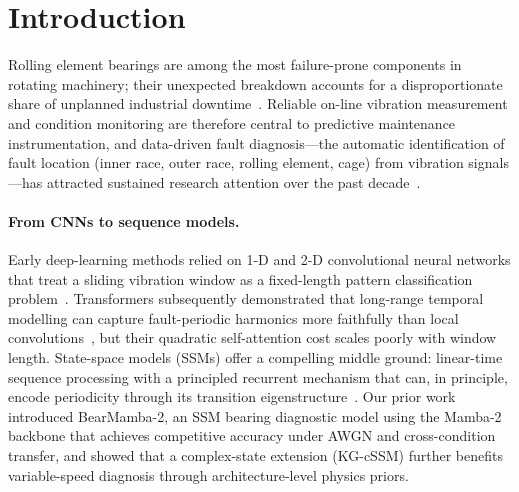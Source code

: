 
\section{Introduction}
\label{sec:intro}

Rolling element bearings are among the most failure-prone components in
rotating machinery; their unexpected breakdown accounts for a disproportionate
share of unplanned industrial downtime~\cite{bearing_importance}.
Reliable on-line vibration measurement and condition monitoring are
therefore central to predictive maintenance instrumentation, and
data-driven fault diagnosis---the automatic identification of fault
location (inner race, outer race, rolling element, cage) from vibration
signals---has attracted sustained research attention over the past
decade~\cite{lei2020applications}.

\paragraph{From CNNs to sequence models.}
Early deep-learning methods relied on 1-D and 2-D convolutional neural
networks that treat a sliding vibration window as a fixed-length pattern
classification problem~\cite{wen2018new,zhang2020deep}.
Transformers subsequently demonstrated that long-range temporal modelling
can capture fault-periodic harmonics more faithfully than local
convolutions~\cite{shao2021transformer_bearing},
but their quadratic self-attention cost scales poorly with window length.
State-space models (SSMs) offer a compelling middle ground:
linear-time sequence processing with a principled recurrent mechanism
that can, in principle, encode periodicity through its transition
eigenstructure~\cite{gu2021efficiently}.
Our prior work introduced BearMamba-2, an SSM bearing diagnostic model
using the Mamba-2 backbone that achieves competitive accuracy under AWGN
and cross-condition transfer, and showed that a complex-state extension
(KG-cSSM) further benefits variable-speed diagnosis through
architecture-level physics priors.

